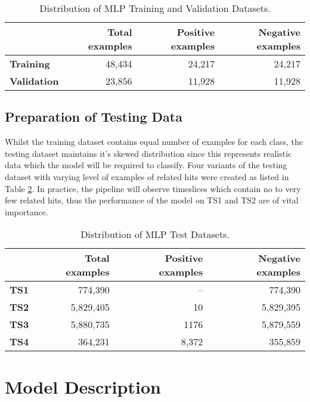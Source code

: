 \begin{table}[htb]
  \centering
  \caption{Distribution of MLP Training and Validation Datasets.}
  \begin{tabular}{lrrr}
    \hline
    & Total examples & Positive examples & Negative examples \\
    \hline
    \textbf{Training} & 48,434 & 24,217 & 24,217 \\
    \textbf{Validation} & 23,856 & 11,928 & 11,928 \\
    \hline
  \end{tabular}
  \label{tab:mlp-train-dist}  
\end{table}

\subsection{Preparation of Testing Data}
\label{sec:mlp-data-prep-test}

Whilst the training dataset contains equal number of examples for each
class, the testing dataset maintains it's skewed distribution since
this represents realistic data which the model will be required to
classify. Four variants of the testing dataset with varying level of
examples of related hits were created as listed in Table
\ref{tab:mlp-test-dist}. In practice, the pipeline will observe
timeslices which contain no to very few related hits, thus the
performance of the model on TS1 and TS2 are of vital importance.

\begin{table}[htb]
  \centering
  \caption{Distribution of MLP Test Datasets.}
  \begin{tabular}{lrrr}
    \hline
    & Total examples & Positive examples & Negative examples \\
    \hline
    \textbf{TS1} & 774,390 & -- & 774,390 \\
    \textbf{TS2} & 5,829,405 & 10 & 5,829,395 \\
    \textbf{TS3} & 5,880,735 & 1176 & 5,879,559 \\
    \textbf{TS4} & 364,231 & 8,372 & 355,859 \\
    \hline
  \end{tabular}
  \label{tab:mlp-test-dist}
\end{table}

\section{Model Description}
\label{sec:mlp-model-desc}

